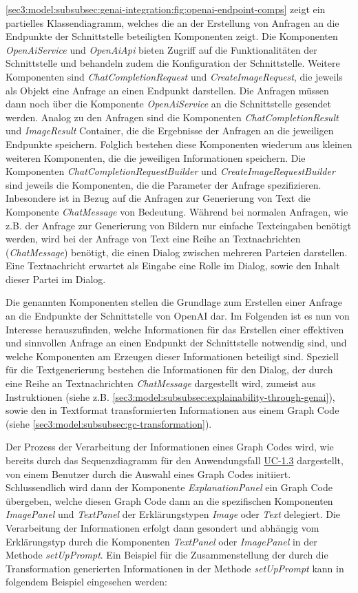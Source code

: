 \cref{sec3:model:subsubsec:genai-integration:fig:openai-endpoint-comps} zeigt ein partielles Klassendiagramm, welches die an der Erstellung von Anfragen an die Endpunkte der Schnittstelle beteiligten Komponenten zeigt.
Die Komponenten \textit{OpenAiService} und \textit{OpenAiApi} bieten Zugriff auf die Funktionalitäten der Schnittstelle und behandeln zudem die Konfiguration der Schnittstelle.
Weitere Komponenten sind \textit{ChatCompletionRequest} und \textit{CreateImageRequest}, die jeweils als Objekt eine Anfrage an einen Endpunkt darstellen.
Die Anfragen müssen dann noch über die Komponente \textit{OpenAiService} an die Schnittstelle gesendet werden.
Analog zu den Anfragen sind die Komponenten \textit{ChatCompletionResult} und \textit{ImageResult} Container, die die Ergebnisse der Anfragen an die jeweiligen Endpunkte speichern.
Folglich bestehen diese Komponenten wiederum aus kleinen weiteren Komponenten, die die jeweiligen Informationen speichern.
Die Komponenten \textit{ChatCompletionRequestBuilder} und \textit{CreateImageRequestBuilder} sind jeweils die Komponenten, die die Parameter der Anfrage spezifizieren.
Inbesondere ist in Bezug auf die Anfragen zur Generierung von Text die Komponente \textit{ChatMessage} von Bedeutung.
Während bei normalen Anfragen, wie z.B. der Anfrage zur Generierung von Bildern nur einfache Texteingaben benötigt werden, wird bei der Anfrage von Text eine Reihe an Textnachrichten (\textit{ChatMessage}) benötigt, die einen Dialog zwischen mehreren Parteien darstellen.
Eine Textnachricht erwartet als Eingabe eine Rolle im Dialog, sowie den Inhalt dieser Partei im Dialog.

Die genannten Komponenten stellen die Grundlage zum Erstellen einer Anfrage an die Endpunkte der Schnittstelle von OpenAI dar.
Im Folgenden ist es nun von Interesse herauszufinden, welche Informationen für das Erstellen einer effektiven und sinnvollen Anfrage an einen Endpunkt der Schnittstelle notwendig sind, und welche Komponenten am Erzeugen dieser Informationen beteiligt sind.
Speziell für die Textgenerierung bestehen die Informationen für den Dialog, der durch eine Reihe an Textnachrichten \textit{ChatMessage} dargestellt wird, zumeist aus Instruktionen (siehe z.B. \cref{sec3:model:subsubsec:explainability-through-genai}), sowie den in Textformat transformierten Informationen aus einem Graph Code (siehe \cref{sec3:model:subsubsec:gc-transformation}).

Der Prozess der Verarbeitung der Informationen eines Graph Codes wird, wie bereits durch das Sequenzdiagramm für den Anwendungsfall \hyperref[sec3:model:uc-1.3]{UC-1.3} dargestellt, von einem Benutzer durch die Auswahl eines Graph Codes initiiert.
Schlussendlich wird dann der Komponente \textit{ExplanationPanel} ein Graph Code übergeben, welche diesen Graph Code dann an die spezifischen Komponenten \textit{ImagePanel} und \textit{TextPanel} der Erklärungstypen \textit{Image} oder \textit{Text} delegiert.
Die Verarbeitung der Informationen erfolgt dann gesondert und abhängig vom Erklärungstyp durch die Komponenten \textit{TextPanel} oder \textit{ImagePanel} in der Methode \textit{setUpPrompt}.
Ein Beispiel für die Zusammenstellung der durch die Transformation generierten Informationen in der Methode \textit{setUpPrompt} kann in folgendem Beispiel eingesehen werden:

